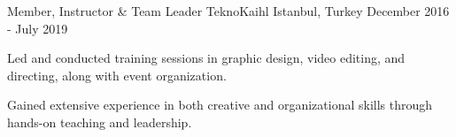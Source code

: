 \begin{cventries}
  \cventry
    {Member, Instructor \& Team Leader} %
    {TeknoKaihl} %
    {Istanbul, Turkey} %
    {December 2016 - July 2019} %
    {
      \begin{cvitems} %
        \item {Led and conducted training sessions in graphic design, video editing, and directing, along with event organization.}
        \item {Gained extensive experience in both creative and organizational skills through hands-on teaching and leadership.}
      \end{cvitems}
    }

\end{cventries}